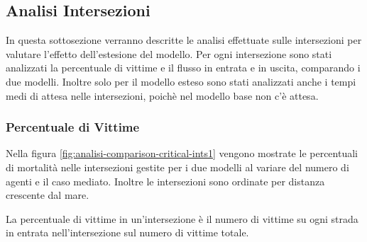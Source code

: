 



\newpage

\subsection{Analisi Intersezioni}
In questa sottosezione verranno descritte le analisi effettuate sulle intersezioni per valutare l'effetto dell'estesione
del modello. Per ogni intersezione sono stati analizzati la percentuale di vittime e il flusso in entrata e in uscita, comparando
i due modelli. Inoltre solo per il modello esteso sono stati analizzati anche i tempi medi di attesa nelle intersezioni,
poichè nel modello base non c'è attesa.

\subsubsection*{Percentuale di Vittime}
Nella figura \ref{fig:analisi-comparison-critical-ints1} vengono mostrate le percentuali di mortalità nelle intersezioni gestite per i due modelli al variare del numero di
agenti e il caso mediato. Inoltre le intersezioni sono ordinate per distanza crescente dal mare.

La percentuale di vittime in un'intersezione è il numero di vittime su ogni strada in entrata nell'intersezione sul numero di vittime totale.

